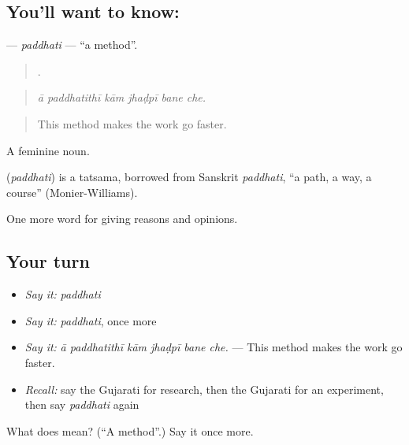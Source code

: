 \subsection*{You'll want to know: }
\textbf{} — \emph{paddhati} — \textquotedblleft{}a method\textquotedblright{}.

\begin{quote}
     .
\end{quote}

\begin{quote}
\emph{ā paddhatithī kām jhaḍpī bane che.}
\end{quote}

\begin{quote}
This method makes the work go faster.
\end{quote}

A feminine noun.

\begin{cousinweb}
\textbf{} (\emph{paddhati}) is a tatsama, borrowed from Sanskrit \emph{paddhati}, \textquotedblleft{}a path, a way, a course\textquotedblright{} (Monier-Williams).
\end{cousinweb}

\begin{grammarlens}[title={What you've built}]
One more word for giving reasons and opinions.
\end{grammarlens}

\subsection*{Your turn}
\begin{itemize}
\raggedright
  \item \emph{Say it:} \emph{paddhati}
  \item \emph{Say it:} \emph{paddhati}, once more
  \item \emph{Say it:} \emph{ā paddhatithī kām jhaḍpī bane che.} — This method makes the work go faster.
  \item \emph{Recall:} say the Gujarati for research, then the Gujarati for an experiment, then say \emph{paddhati} again
\end{itemize}

\begin{tcolorbox}[breakable,colback=teal!4,colframe=teal!35!black,title={Before you move on}]
What does  mean? (\textquotedblleft{}A method\textquotedblright{}.) Say it once more.
\end{tcolorbox}
